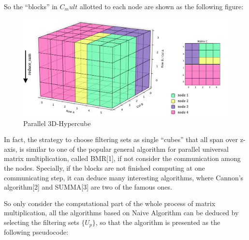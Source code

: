 \documentclass{amsart}
\theoremstyle{definition}
\theoremstyle{remark}
\numberwithin{equation}{section}
\begin{document}
\par
So the “blocks” in ${C_mult}$ allotted to each node are shown as the following figure:\\
\begin{figure}[tb]
	\includegraphics[scale=0.3]{Figures/Matrix3d_Filter.png}
	\caption{Parallel 3D-Hypercube}
\end{figure}
\par
	In fact, the strategy to choose filtering sets as single “cubes” that all span over z-axis, is similar to one of the popular general algorithm for parallel universal matrix multiplication, called BMR[1], if not consider the communication among the nodes. Specially, if the blocks are not finished computing at one communicating step, it can deduce many interesting algorithms, where Cannon’s algorithm[2] and SUMMA[3] are two of the famous ones.\par
	So only consider the computational part of the whole process of matrix multiplication, all the algorithms based on Naive Algorithm can be deduced by selecting the filtering sets $\{U_p\}$, so that the algorithm is presented as the following pseudocode:\par
\end{document}
